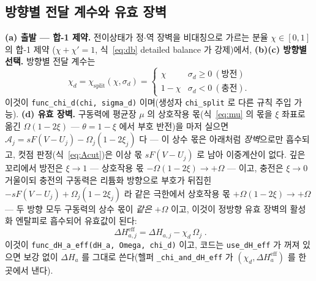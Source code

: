 \documentclass[11pt,a4paper]{article}
\newcommand{\eff}{\mathrm{eff}}
\newcommand{\code}[1]{\texttt{#1}}
\begin{document}
\subsection{방향별 전달 계수와 유효 장벽}
\textbf{(a) 출발 — 합-1 제약.} 전이상태가 정$\cdot$역 장벽을 비대칭으로 가르는 분율 $\chi\in[0,1]$ 의 합-1 제약
($\chi+\chi'=1$, 식~\eqref{eq:db} detailed balance 가 강제)에서, \textbf{(b)(c) 방향별 선택.} 방향별 전달 계수는
\begin{equation}
\chi_d=\chi_\mathrm{split}(\chi,\sigma_d)=
\begin{cases}\chi & \sigma_d\ge0\ (\text{방전})\\ 1-\chi & \sigma_d<0\ (\text{충전}).\end{cases}
\label{eq:chid}
\end{equation}
이것이 \code{func\_chi\_d(chi, sigma\_d)} 이며(생성자 \code{chi\_split} 로 다른 규칙 주입 가능). \textbf{(d) 유효 장벽.}
구동력에 평균장 $\mu$ 의 상호작용 몫(식~\eqref{eq:mu} 의 몫을 $\xi$ 좌표로 옮긴 $\Omega(1-2\xi)$ — $\theta=1-\xi$ 에서 부호 반전)을 마저 실으면
$\mathcal A_j=sF(V-U_j)-\Omega_j(1-2\xi_j)$ 다 — 이 상수 몫은 아래처럼 \emph{장벽}으로만 흡수되고, 컷점
판정(식~\eqref{eq:Acut})은 이상 몫 $sF(V-U_j)$ 로 남아 이중계산이 없다.
깊은 꼬리에서 방전은 $\xi\to1$ — 상호작용 몫
$-\Omega(1-2\xi)\to+\Omega$ — 이고, 충전은 $\xi\to0$ 거울이되 충전의 구동력은 리튬화 방향으로 부호가 뒤집힌
$-sF(V-U_j)+\Omega_j(1-2\xi_j)$ 라 같은 극한에서 상호작용 몫 $+\Omega(1-2\xi)\to+\Omega$ — 두 방향 모두
구동력의 상수 몫이 \emph{같은} $+\Omega$ 이고, 이것이 정방향 유효 장벽의 활성화 엔탈피로 흡수되어 유효값이 된다:
\begin{equation}
\boxed{\;\Delta H_{a,j}^\eff=\Delta H_{a,j}-\chi_d\,\Omega_j\;.}
\label{eq:dHeff}
\end{equation}
이것이 \code{func\_dH\_a\_eff(dH\_a, Omega, chi\_d)} 이고, 코드는 \code{use\_dH\_eff} 가 꺼져 있으면 보강 없이
$\Delta H_a$ 를 그대로 쓴다(헬퍼 \code{\_chi\_and\_dH\_eff} 가 $(\chi_d,\Delta H_a^\eff)$ 를 한 곳에서 낸다).
\end{document}

